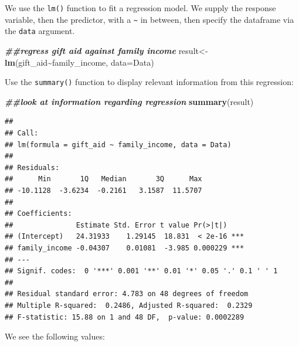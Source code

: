 \documentclass[
]{book}
\newenvironment{Shaded}{\begin{snugshade}}{\end{snugshade}}
\newcommand{\AttributeTok}[1]{\textcolor[rgb]{0.13,0.29,0.53}{#1}}
\newcommand{\DocumentationTok}[1]{\textcolor[rgb]{0.56,0.35,0.01}{\textbf{\textit{#1}}}}
\newcommand{\FunctionTok}[1]{\textcolor[rgb]{0.13,0.29,0.53}{\textbf{#1}}}
\newcommand{\NormalTok}[1]{#1}
\newcommand{\OtherTok}[1]{\textcolor[rgb]{0.56,0.35,0.01}{#1}}
\newcommand{\SpecialCharTok}[1]{\textcolor[rgb]{0.81,0.36,0.00}{\textbf{#1}}}
\begin{document}
We use the \texttt{lm()} function to fit a regression model. We supply the response variable, then the predictor, with a \texttt{\textasciitilde{}} in between, then specify the dataframe via the \texttt{data} argument.

\begin{Shaded}
\begin{Highlighting}[]
\DocumentationTok{\#\#regress gift aid against family income}
\NormalTok{result}\OtherTok{\textless{}{-}}\FunctionTok{lm}\NormalTok{(gift\_aid}\SpecialCharTok{\textasciitilde{}}\NormalTok{family\_income, }\AttributeTok{data=}\NormalTok{Data)}
\end{Highlighting}
\end{Shaded}

Use the \texttt{summary()} function to display relevant information from this regression:

\begin{Shaded}
\begin{Highlighting}[]
\DocumentationTok{\#\#look at information regarding regression}
\FunctionTok{summary}\NormalTok{(result)}
\end{Highlighting}
\end{Shaded}

\begin{verbatim}
## 
## Call:
## lm(formula = gift_aid ~ family_income, data = Data)
## 
## Residuals:
##      Min       1Q   Median       3Q      Max 
## -10.1128  -3.6234  -0.2161   3.1587  11.5707 
## 
## Coefficients:
##               Estimate Std. Error t value Pr(>|t|)    
## (Intercept)   24.31933    1.29145  18.831  < 2e-16 ***
## family_income -0.04307    0.01081  -3.985 0.000229 ***
## ---
## Signif. codes:  0 '***' 0.001 '**' 0.01 '*' 0.05 '.' 0.1 ' ' 1
## 
## Residual standard error: 4.783 on 48 degrees of freedom
## Multiple R-squared:  0.2486, Adjusted R-squared:  0.2329 
## F-statistic: 15.88 on 1 and 48 DF,  p-value: 0.0002289
\end{verbatim}

We see the following values:
\end{document}
